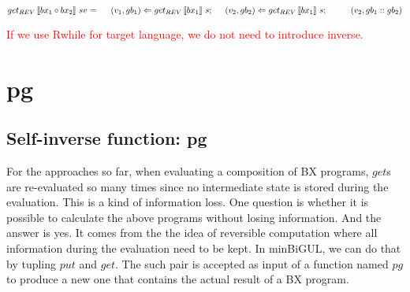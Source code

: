 \documentclass[runningheads]{llncs}
\newcommand{\tab}{\hspace*{5mm}}
\newcommand{\qtab}{\hspace*{5mm} \ \quad}
\newcommand{\getrev}[2]{get_{REV} \, [\![#1]\!] \ {#2}}
\begin{document}
$\getrev{bx_1 \circ bx_2}{s}{v} =\\
    \tab (v_1, gb_1) \Leftarrow \getrev{bx_1}{s};\\
    \tab (v_2, gb_2) \Leftarrow \getrev{bx_1}{s};\\
        \qtab (v_2, gb_1 :: gb_2)$

\textcolor{red}{If we use Rwhile for target language, we do not need to introduce inverse.}

\section{pg}
\subsection{Self-inverse function: pg}


For the approaches so far, when evaluating a composition of BX programs, $get$s are re-evaluated so many times since no intermediate state is stored during the evaluation. This is a kind of information loss. One question is whether it is possible to calculate the above programs without losing information. And the answer is yes. It comes from the the idea of reversible computation where all information during the evaluation need to be kept. In minBiGUL, we can do that by tupling $put$ and $get$. The such pair is accepted as input of a function named $pg$ to produce a new one that contains the actual result of a BX program.
\end{document}
